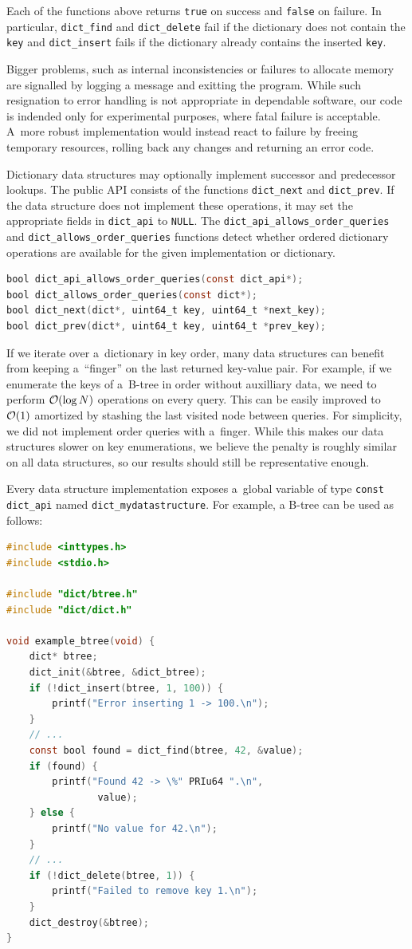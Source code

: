 Each of the functions above returns \texttt{true} on success and \texttt{false}
on failure. In particular, \texttt{dict\_find} and \texttt{dict\_delete} fail
if the dictionary does not contain the \texttt{key} and \texttt{dict\_insert}
fails if the dictionary already contains the inserted \texttt{key}.

Bigger problems, such as internal inconsistencies or failures to allocate
memory are signalled by logging a message and exitting the program.
While such resignation to error handling is not appropriate in dependable
software, our code is indended only for experimental purposes, where fatal
failure is acceptable. A~more robust implementation would instead react
to failure by freeing temporary resources, rolling back any changes
and returning an error code.

Dictionary data structures may optionally implement successor and predecessor
lookups. The public API consists of the functions \texttt{dict\_next} and
\texttt{dict\_prev}. If the data structure does not implement these operations,
it may set the appropriate fields in \texttt{dict\_api} to \texttt{NULL}.
The \texttt{dict\_api\_allows\_order\_queries} and
\texttt{dict\_allows\_order\_queries} functions detect whether ordered
dictionary operations are available for the given implementation or dictionary.
\begin{lstlisting}[language=C]
bool dict_api_allows_order_queries(const dict_api*);
bool dict_allows_order_queries(const dict*);
bool dict_next(dict*, uint64_t key, uint64_t *next_key);
bool dict_prev(dict*, uint64_t key, uint64_t *prev_key);
\end{lstlisting}
If we iterate over a~dictionary in key order, many data structures can benefit
from keeping a~``finger'' on the last returned key-value pair. For example,
if we enumerate the keys of a~\mbox{B-tree} in order without auxilliary data,
we need to perform $\mathcal{O}(\log N)$ operations on every query. This can be easily
improved to $\mathcal{O}(1)$ amortized by stashing the last visited node between
queries. For simplicity, we did not implement order queries with a~finger.
While this makes our data structures slower on key enumerations, we believe
the penalty is roughly similar on all data structures, so our results should
still be representative enough.

Every data structure implementation exposes a~global variable of type
\texttt{const dict\_api} named \texttt{dict\_mydatastructure}. For example,
a B-tree can be used as follows:

\begin{lstlisting}[language=C]
#include <inttypes.h>
#include <stdio.h>

#include "dict/btree.h"
#include "dict/dict.h"

void example_btree(void) {
	dict* btree;
	dict_init(&btree, &dict_btree);
	if (!dict_insert(btree, 1, 100)) {
		printf("Error inserting 1 -> 100.\n");
	}
	// ...
	const bool found = dict_find(btree, 42, &value);
	if (found) {
		printf("Found 42 -> \%" PRIu64 ".\n",
				value);
	} else {
		printf("No value for 42.\n");
	}
	// ...
	if (!dict_delete(btree, 1)) {
		printf("Failed to remove key 1.\n");
	}
	dict_destroy(&btree);
}
\end{lstlisting}

